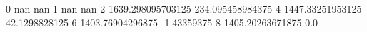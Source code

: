 0 nan nan
1 nan nan
2 1639.298095703125 234.095458984375
4 1447.33251953125 42.1298828125
6 1403.76904296875 -1.43359375
8 1405.20263671875 0.0
